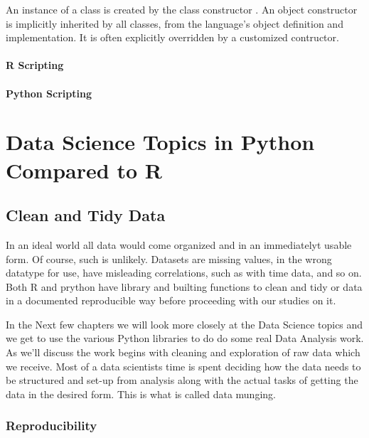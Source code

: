 \documentclass[]{book}
\theoremstyle{definition}
\theoremstyle{definition}
\theoremstyle{definition}
\theoremstyle{remark}
\begin{document}
An instance of a class is created by the class constructor
. An object constructor is implicitly inherited by
all classes, from the language's object definition and implementation.
It is often explicitly overridden by a customized contructor.

\subsection{R Scripting}\label{r-scripting-4}

\subsection{Python Scripting}\label{python-scripting-4}

\part{Data Science Topics in Python Compared to
R}\label{part-data-science-topics-in-python-compared-to-r}

\chapter{Clean and Tidy Data}\label{clean-and-tidy-data}

  In an ideal world all data would
come organized and in an immediatelyt usable form. Of course, such is
unlikely. Datasets are missing values, in the wrong datatype for use,
have misleading correlations, such as with time data, and so on. Both R
and prython have library and builting functions to clean and tidy or
data in a documented reproducible way before proceeding with our studies
on it.

In the Next few chapters we will look more closely at the Data Science
topics and we get to use the various Python libraries to do do some real
Data Analysis work. As we'll discuss the work begins with cleaning and
exploration of raw data which we receive. Most of a data scientists time
is spent deciding how the data needs to be structured and set-up from
analysis along with the actual tasks of getting the data in the desired
form. This is what is called data munging.

\section{Reproducibility}\label{reproducibility}
\end{document}

